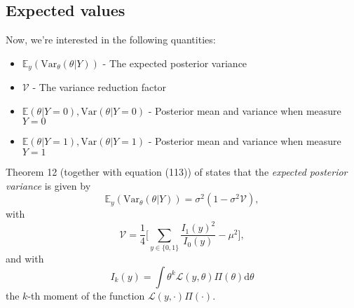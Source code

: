 \documentclass[]{report}
\begin{document}
\subsection{Expected values}
Now, we're interested in the following quantities:
\begin{itemize}
    \item $\mathbb{E}_y(\text{Var}_{\theta}(\theta | Y))$ - The expected posterior variance
    \item $\mathcal{V}$ - The variance reduction factor
    \item $\mathbb{E}(\theta | Y=0), \text{Var}(\theta|Y=0)$ - Posterior mean and variance when measure $Y=0$
    \item $\mathbb{E}(\theta | Y=1), \text{Var}(\theta|Y=1)$ - Posterior mean and variance when measure $Y=1$
\end{itemize}

Theorem 12 (together with equation (113)) of \cite{Koh2020} states that the \textit{expected posterior variance} is given by
\begin{equation}
    \mathbb{E}_y(\text{Var}_{\theta}(\theta | Y)) = \sigma^2(1-\sigma^2\mathcal{V}),
\end{equation}
with
\begin{equation}
    \mathcal{V} = \frac{1}{4}\Bigg[ \sum_{y\in \{0,1\}}\frac{I_1(y)^2}{I_0(y)} - \mu^2\Bigg],
\end{equation}
and with
\begin{equation}
    I_k(y) = \int \theta^k \mathcal{L}(y, \theta)\Pi(\theta) \text{d}\theta
\end{equation}
the $k$-th moment of the function $\mathcal{L}(y, \cdot)\Pi(\cdot)$.
\end{document}
